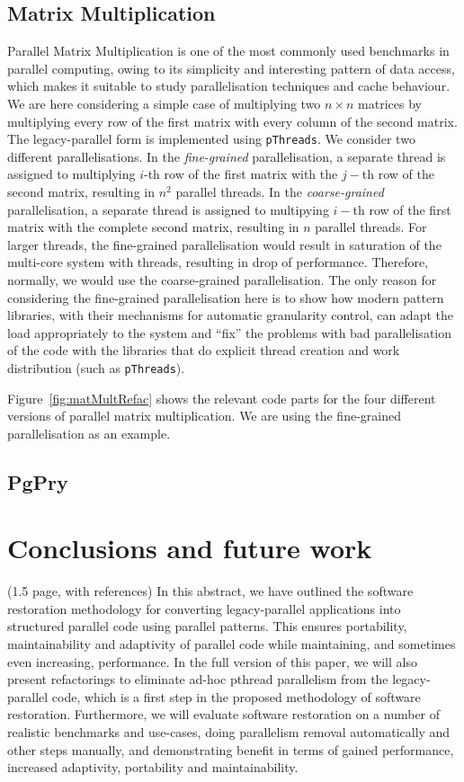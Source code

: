 \documentclass[runningheads]{llncs}
\begin{document}
\subsection{Matrix Multiplication}
Parallel Matrix Multiplication is one of the most commonly used benchmarks in parallel computing, owing to its simplicity and interesting pattern of data access, which makes it suitable to study parallelisation techniques and cache behaviour. We are here considering a simple case of multiplying two $n \times n$ matrices by multiplying every row of the first matrix with every column of the second matrix. The legacy-parallel form is implemented using \lstinline{pThreads}. We consider two different parallelisations. In the \emph{fine-grained} parallelisation, a separate thread is assigned to multiplying $i$-th row of the first matrix with the $j-$th row of the second matrix, resulting in $n^2$ parallel threads. In the \emph{coarse-grained} parallelisation, a separate thread is assigned to multipying $i-$th row of the first matrix with the complete second matrix, resulting in $n$ parallel threads. For larger threads, the fine-grained parallelisation would result in saturation of the multi-core system with threads, resulting in drop of performance. Therefore, normally, we would use the coarse-grained parallelisation. The only reason for considering the fine-grained parallelisation here is to show how modern pattern libraries, with their mechanisms for automatic granularity control, can adapt the load appropriately to the system and ``fix'' the problems with bad parallelisation of the code with the libraries that do explicit thread creation and work distribution (such as \lstinline{pThreads}).

Figure~\ref{fig:matMultRefac} shows the relevant code parts for the four different versions of parallel matrix multiplication. We are using the fine-grained parallelisation as an example.



\subsection{PgPry}


\section{Conclusions and future work} \label{sec:Conclusions} (1.5 page, with references)
In this abstract, we have outlined the software restoration methodology for converting legacy-parallel applications into structured parallel code using parallel patterns. This ensures portability, maintainability and adaptivity of parallel code while maintaining, and sometimes even increasing, performance. In the full version of this paper, we will also present refactorings to eliminate ad-hoc pthread parallelism from the legacy-parallel code, which is a first step in the proposed methodology of software restoration. Furthermore, we will evaluate software restoration on a number of realistic benchmarks and use-cases, doing parallelism removal automatically and other steps manually, and demonstrating benefit in terms of gained performance, increased adaptivity, portability and maintainability.
\end{document}
